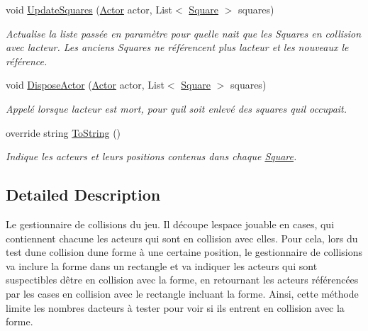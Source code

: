 \begin{DoxyCompactItemize}
void \hyperlink{class_tentacle_slicers_1_1maps_1_1_squares_handler_a729b67b5c51d0e676f974e83e5e1743f}{Update\+Squares} (\hyperlink{class_tentacle_slicers_1_1actors_1_1_actor}{Actor} actor, List$<$ \hyperlink{class_tentacle_slicers_1_1maps_1_1_square}{Square} $>$ squares)
\begin{DoxyCompactList}\small\item\em Actualise la liste passée en paramètre pour qu\textquotesingle{}elle n\textquotesingle{}ait que les Squares en collision avec l\textquotesingle{}acteur. Les anciens Squares ne référencent plus l\textquotesingle{}acteur et les nouveaux le référence. \end{DoxyCompactList}\item 
void \hyperlink{class_tentacle_slicers_1_1maps_1_1_squares_handler_a2a62ea5ef7ec0cc77fc29954593b1e26}{Dispose\+Actor} (\hyperlink{class_tentacle_slicers_1_1actors_1_1_actor}{Actor} actor, List$<$ \hyperlink{class_tentacle_slicers_1_1maps_1_1_square}{Square} $>$ squares)
\begin{DoxyCompactList}\small\item\em Appelé lorsque l\textquotesingle{}acteur est mort, pour qu\textquotesingle{}il soit enlevé des squares qu\textquotesingle{}il occupait. \end{DoxyCompactList}\item 
override string \hyperlink{class_tentacle_slicers_1_1maps_1_1_squares_handler_afb49d452ddd0e4ff5b5bbc19e90b870c}{To\+String} ()
\begin{DoxyCompactList}\small\item\em Indique les acteurs et leurs positions contenus dans chaque \hyperlink{class_tentacle_slicers_1_1maps_1_1_square}{Square}. \end{DoxyCompactList}\end{DoxyCompactItemize}


\subsection{Detailed Description}
Le gestionnaire de collisions du jeu. Il découpe l\textquotesingle{}espace jouable en cases, qui contiennent chacune les acteurs qui sont en collision avec elles. Pour cela, lors du test d\textquotesingle{}une collision d\textquotesingle{}une forme à une certaine position, le gestionnaire de collisions va inclure la forme dans un rectangle et va indiquer les acteurs qui sont suspectibles d\textquotesingle{}être en collision avec la forme, en retournant les acteurs référencées par les cases en collision avec le rectangle incluant la forme. Ainsi, cette méthode limite les nombres d\textquotesingle{}acteurs à tester pour voir si ils entrent en collision avec la forme. 



